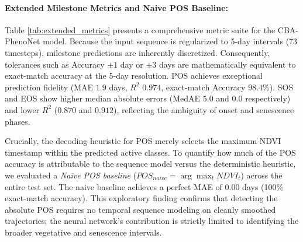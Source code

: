 \documentclass[runningheads]{llncs}
\begin{document}
\paragraph{Extended Milestone Metrics and Naive POS Baseline:}
Table \ref{tab:extended_metrics} presents a comprehensive metric suite for the CBA-PhenoNet model. Because the input sequence is regularized to 5-day intervals (73 timesteps), milestone predictions are inherently discretized. Consequently, tolerances such as Accuracy $\pm 1$ day or $\pm 3$ days are mathematically equivalent to exact-match accuracy at the 5-day resolution. POS achieves exceptional prediction fidelity (MAE $1.9$ days, $R^2$ $0.974$, exact-match Accuracy $98.4\%$). SOS and EOS show higher median absolute errors (MedAE $5.0$ and $0.0$ respectively) and lower $R^2$ ($0.870$ and $0.912$), reflecting the ambiguity of onset and senescence phases.

Crucially, the decoding heuristic for POS merely selects the maximum NDVI timestamp within the predicted active classes. To quantify how much of the POS accuracy is attributable to the sequence model versus the deterministic heuristic, we evaluated a \textit{Naive POS baseline} ($POS_{naive} = \arg\max_t NDVI_t$) across the entire test set. The naive baseline achieves a perfect MAE of 0.00 days (100\% exact-match accuracy). This exploratory finding confirms that detecting the absolute POS requires no temporal sequence modeling on cleanly smoothed trajectories; the neural network's contribution is strictly limited to identifying the broader vegetative and senescence intervals.

\begin{table}[h!]
\centering
\caption{Extended evaluation metrics for milestone decoding (CBA-PhenoNet, pooled across 10 seeds). Acc$\pm3$ is equivalent to exact-match accuracy due to 5-day temporal discretization. Note: RMSE values here are calculated globally across concatenated predictions, distinguishing them from Table \ref{tab:ablation_metrics} which reports the mean of per-seed RMSEs.}
\label{tab:extended_metrics}
\end{table}
\end{document}
